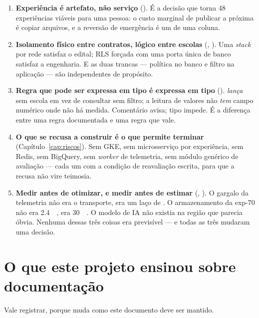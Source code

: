 \begin{enumerate}
  \item \textbf{Experiência é artefato, não serviço} (). É a decisão
    que torna 48 experiências viáveis para uma pessoa: o custo marginal de
    publicar a próxima é copiar arquivos, e a reversão de emergência é um
     de uma coluna.

  \item \textbf{Isolamento físico entre contratos, lógico entre escolas}
    (, ). Uma \emph{stack} por rede satisfaz o edital;
    RLS forçada com uma porta única de banco satisfaz a engenharia. E as duas
    trancas --- política no banco e filtro na aplicação --- são independentes de
    propósito.

  \item \textbf{Regra que pode ser expressa em tipo é expressa em tipo}
    ().  \emph{lança} sem escola em vez de consultar
    sem filtro; a leitura de valores não \emph{tem} campo numérico onde não há
    medida. Comentário avisa; tipo impede. É a diferença entre uma regra
    documentada e uma regra que vale.

  \item \textbf{O que se recusa a construir é o que permite terminar}
    (Capítulo~\ref{cap:riscos}). Sem GKE, sem microsserviço por experiência, sem
    Redis, sem BigQuery, sem \emph{worker} de telemetria, sem módulo genérico de
    avaliação --- cada um com a condição de reavaliação escrita, para que a recusa
    não vire teimosia.

  \item \textbf{Medir antes de otimizar, e medir antes de estimar}
    (, ). O gargalo da telemetria não era o transporte,
    era um laço de . O armazenamento da exp-70 não era
    \SI{2.4}{\giga\byte}, era \SI{30}{\mega\byte}. O modelo de IA não existia na
    região que parecia óbvia. Nenhuma dessas três coisas era previsível --- e
    todas as três mudaram uma decisão.
\end{enumerate}

\section{O que este projeto ensinou sobre documentação}

Vale registrar, porque muda como este documento deve ser mantido.

